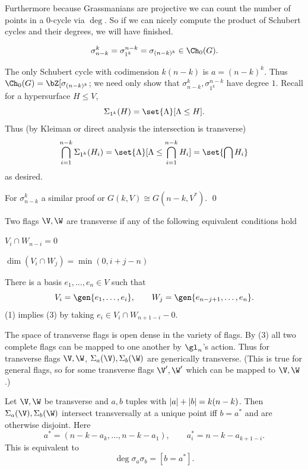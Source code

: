     Furthermore because Grassmanians are projective we can count the number of points in a $0$-cycle via $\deg$.
    So if we can nicely compute the product of Schubert cycles and their degrees, we will have finished.

\eremark

\bprop

    $$ \sigma_{n-k}^k = \sigma_{1^k}^{n-k} = \sigma_{(n-k)^k} \in \Ch_0(G) . $$

\eprop

\bproof

    The only Schubert cycle with codimension $k(n-k)$ is $a=(n-k)^k$.
    Thus $\Ch_0(G)=\bZ[\sigma_{(n-k)^k}$; we need only show that $\sigma_{n-k}^k,\sigma_{1^k}^{n-k}$ have degree $1$.
    Recall for a hypersurface $H\leq V$,
    $$ \Sigma_{1^k}(H) = \set{\Lambda}[\Lambda\leq H] . $$
    Thus (by Kleiman or direct analysis the intersection is transverse)
    $$ \bigcap_{i=1}^{n-k}\Sigma_{1^k}(H_i) = \set{\Lambda}[\Lambda\leq\bigcap_{i=1}^{n-k}H_i] = \set{\bigcap H_i} $$
    as desired.

    For $\sigma_{n-k}^k$ a similar proof or $G(k,V)\cong G(n-k,V^*)$.
    \qed

\eproof

\bdefn

    Two flags $\V,\W$ are {\emphcolor transverse} if any of the following equivalent conditions hold
    \benum
        \item $V_i\cap W_{n-i}=0$
        \item $\dim(V_i\cap W_j)=\min(0,i+j-n)$
        \item There is a basis $e_1,\dots,e_n\in V$ such that
        $$ V_i = \gen{e_1,\dots,e_i},\qquad W_j = \gen{e_{n-j+1},\dots,e_n} . $$
    \eenum
    (1) implies (3) by taking $e_i\in V_i\cap W_{n+1-i}-0$.

\edefn

The space of transverse flags is open dense in the variety of flags.
By (3) all two complete flags can be mapped to one another by $\gl_n$'s action.
Thus for transverse flags $\V,\W$, $\Sigma_a(\V),\Sigma_b(\W)$ are generically transverse.
(This is true for general flags, so for some transverse flags $\V',\W'$ which can be mapped to $\V,\W$.)

\bprop

    Let $\V,\W$ be transverse and $a,b$ tuples with $\mathopen{}\mathclose{\left|a\right|}+\mathopen{}\mathclose{\left|b\right|}=k(n-k)$.
    Then $\Sigma_a(\V),\Sigma_b(\W)$ intersect transversally at a unique point iff $b=a^*$ and are otherwise disjoint.
    Here
    $$ a^* = (n-k-a_k,\dots,n-k-a_1),\qquad a^*_i = n - k - a_{k+1-i} . $$
    This is equivalent to
    $$ \deg\sigma_a\sigma_b = [b=a^*] . $$

